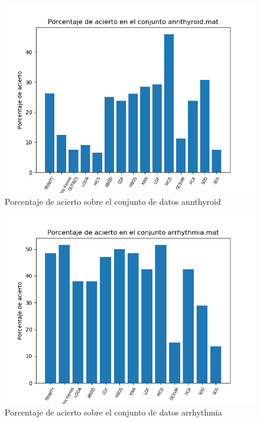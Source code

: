 \begin{figure}[H]
	\centering
	\includegraphics[scale=0.7]{imagenes/imgs-exp1/accuracy/annthyroid}
	\caption{Porcentaje de acierto sobre el conjunto de datos annthyroid}
	\label{annthyroid_accuracy}
\end{figure}

\begin{figure}[H]
	\centering
	\includegraphics[scale=0.7]{imagenes/imgs-exp1/accuracy/arrhythmia}
	\caption{Porcentaje de acierto sobre el conjunto de datos arrhythmia}
	\label{arrhythmia_accuracy}
\end{figure}

